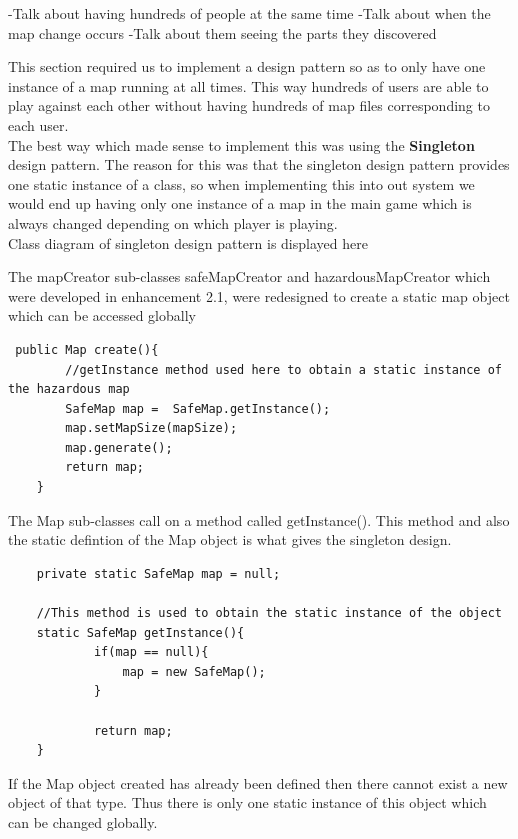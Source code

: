 \documentclass[a4paper,12pt]{extarticle}
\begin{document}
-Talk about having hundreds of people at the same time
-Talk about when the map change occurs
-Talk about them seeing the parts they discovered

This section required us to implement a design pattern so as to only have one instance of a map running at all times. This way hundreds of users are able to play against each other without having hundreds of map files corresponding to each user.\\

The best way which made sense to implement this was using the \textbf{Singleton} design pattern. The reason for this was that the singleton design pattern provides one static instance of a class, so when implementing this into out system we would end up having only one instance of a map in the main game which is always changed depending on which player is playing.\\

Class diagram of singleton design pattern is displayed here

The mapCreator sub-classes safeMapCreator and hazardousMapCreator which were developed in enhancement 2.1, were redesigned to create a static map object which can be accessed globally 

\begin{lstlisting}
 public Map create(){
        //getInstance method used here to obtain a static instance of the hazardous map
        SafeMap map =  SafeMap.getInstance();
        map.setMapSize(mapSize);
        map.generate();
        return map;
    }
\end{lstlisting}

The Map sub-classes call on a method called getInstance(). This method and also the static defintion of the Map object is what gives the singleton design.

\begin{lstlisting}
    private static SafeMap map = null;
    
    //This method is used to obtain the static instance of the object
    static SafeMap getInstance(){
            if(map == null){
                map = new SafeMap();
            }

            return map;
    }
\end{lstlisting}

If the Map object created has already been defined then there cannot exist a new object of that type. Thus there is only one static instance of this object which can be changed globally.\\
\end{document}
